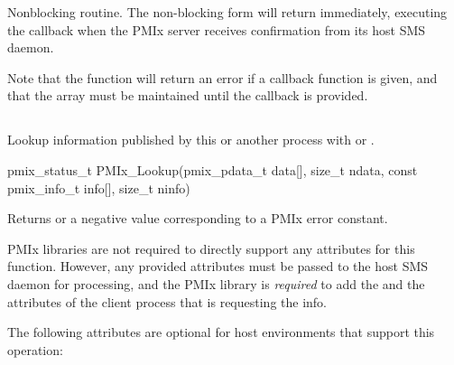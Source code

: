 \descr

Nonblocking  routine. The non-blocking form will return immediately, executing the callback when the \ac{PMIx} server receives confirmation from its host \ac{SMS} daemon.

Note that the function will return an error if a  callback function is given, and that the  array must be maintained until the callback is provided.


\subsection{}

\summary

Lookup information published by this or another process with  or .

\format

\cspecificstart
\begin{codepar}
pmix_status_t
PMIx_Lookup(pmix_pdata_t data[], size_t ndata,
            const pmix_info_t info[], size_t ninfo)
\end{codepar}
\cspecificend

\begin{arglist}
\end{arglist}

Returns  or a negative value corresponding to a PMIx error constant.

\reqattrstart
\ac{PMIx} libraries are not required to directly support any attributes for this function. However, any provided attributes must be passed to the host \ac{SMS} daemon for processing, and the \ac{PMIx} library is \textit{required} to add the  and the  attributes of the client process that is requesting the info.

\reqattrend

\optattrstart
The following attributes are optional for host environments that support this operation:


